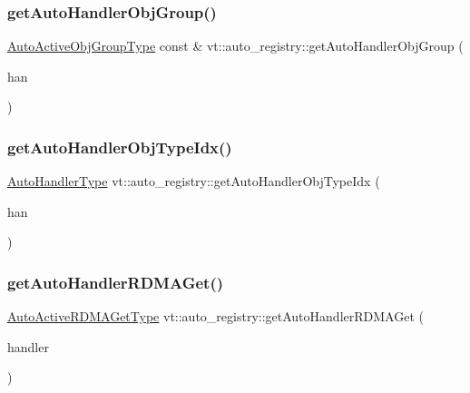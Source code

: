 \subsubsection{\texorpdfstring{get\+Auto\+Handler\+Obj\+Group()}{getAutoHandlerObjGroup()}}
{\footnotesize\ttfamily \hyperlink{namespacevt_1_1auto__registry_a4b369568c19084c562ddbeef6894a145}{Auto\+Active\+Obj\+Group\+Type} const  \& vt\+::auto\+\_\+registry\+::get\+Auto\+Handler\+Obj\+Group (\begin{DoxyParamCaption}\item[{\hyperlink{namespacevt_af64846b57dfcaf104da3ef6967917573}{Handler\+Type}}]{han }\end{DoxyParamCaption})\hspace{0.3cm}{\ttfamily [inline]}}

\mbox{\label{namespacevt_1_1auto__registry_a0c47caf1e4978208704029c0d0f925f0}} 
\subsubsection{\texorpdfstring{get\+Auto\+Handler\+Obj\+Type\+Idx()}{getAutoHandlerObjTypeIdx()}}
{\footnotesize\ttfamily \hyperlink{namespacevt_1_1auto__registry_ae295e18699146815bb7d7674594d95d7}{Auto\+Handler\+Type} vt\+::auto\+\_\+registry\+::get\+Auto\+Handler\+Obj\+Type\+Idx (\begin{DoxyParamCaption}\item[{\hyperlink{namespacevt_af64846b57dfcaf104da3ef6967917573}{Handler\+Type}}]{han }\end{DoxyParamCaption})\hspace{0.3cm}{\ttfamily [inline]}}

\mbox{\label{namespacevt_1_1auto__registry_a28f13a453b20fa9ccdfafaaab238bb65}} 
\subsubsection{\texorpdfstring{get\+Auto\+Handler\+R\+D\+M\+A\+Get()}{getAutoHandlerRDMAGet()}}
{\footnotesize\ttfamily \hyperlink{namespacevt_1_1auto__registry_a039813f93a5804c77ae612e0318fb335}{Auto\+Active\+R\+D\+M\+A\+Get\+Type} vt\+::auto\+\_\+registry\+::get\+Auto\+Handler\+R\+D\+M\+A\+Get (\begin{DoxyParamCaption}\item[{\hyperlink{namespacevt_af64846b57dfcaf104da3ef6967917573}{Handler\+Type} const}]{handler }\end{DoxyParamCaption})\hspace{0.3cm}{\ttfamily [inline]}}

